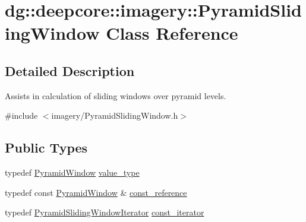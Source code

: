 \hypertarget{classdg_1_1deepcore_1_1imagery_1_1_pyramid_sliding_window}{}\section{dg\+:\+:deepcore\+:\+:imagery\+:\+:Pyramid\+Sliding\+Window Class Reference}
\label{classdg_1_1deepcore_1_1imagery_1_1_pyramid_sliding_window}


\subsection{Detailed Description}
Assists in calculation of sliding windows over pyramid levels. 

{\ttfamily \#include $<$imagery/\+Pyramid\+Sliding\+Window.\+h$>$}

\subsection*{Public Types}
\begin{DoxyCompactItemize}
\item 
typedef \hyperlink{structdg_1_1deepcore_1_1imagery_1_1_pyramid_window}{Pyramid\+Window} \hyperlink{classdg_1_1deepcore_1_1imagery_1_1_pyramid_sliding_window_ab19431f1af5d94cf35d3c13e62831b0a}{value\+\_\+type}
\item 
typedef const \hyperlink{structdg_1_1deepcore_1_1imagery_1_1_pyramid_window}{Pyramid\+Window} \& \hyperlink{classdg_1_1deepcore_1_1imagery_1_1_pyramid_sliding_window_a2607e7416973611462d45f5a3772b46e}{const\+\_\+reference}
\item 
typedef \hyperlink{classdg_1_1deepcore_1_1imagery_1_1_pyramid_sliding_window_iterator}{Pyramid\+Sliding\+Window\+Iterator} \hyperlink{classdg_1_1deepcore_1_1imagery_1_1_pyramid_sliding_window_ac39f725e03255cd3776e47672a02e78f}{const\+\_\+iterator}
\end{DoxyCompactItemize}
